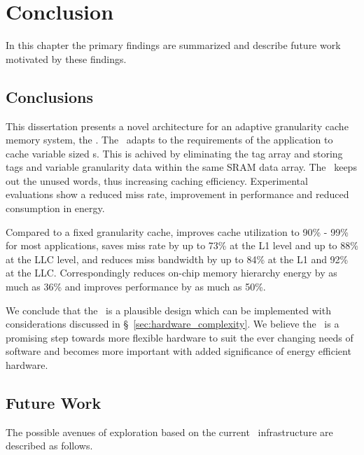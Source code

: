 
%
%

\chapter{Conclusion}
\label{chap:conclusions}

In this chapter the primary findings are summarized and describe future work motivated by these findings. 

\section{Conclusions}

This dissertation presents a novel architecture for an adaptive granularity cache memory system, the \AC{}. The \AC\ adapts to the requirements of the application to cache variable sized \AB{}s. This is achived by eliminating the tag array and storing tags and variable granularity data within the same SRAM data array. The \AC\ keeps out the unused words, thus increasing caching efficiency. Experimental evaluations show a reduced miss rate, improvement in performance and reduced consumption in energy. 

Compared to a fixed granularity cache, improves cache utilization to 90\% - 99\% for most applications, saves miss rate by up to 73\% at the L1 level and up to 88\% at the LLC level, and reduces miss bandwidth by up to 84\% at the L1 and 92\% at the LLC. Correspondingly reduces on-chip memory hierarchy energy by as much as 36\% and improves performance by as much as 50\%.

We conclude that the \AC\ is a plausible design which can be implemented with considerations discussed in \S~\ref{sec:hardware_complexity}. We believe the \AC\ is a promising step towards more flexible hardware to suit the ever changing needs of software and becomes more important with added significance of energy efficient hardware.

\section{Future Work}
The possible avenues of exploration based on the current \AC\ infrastructure are described as follows.

